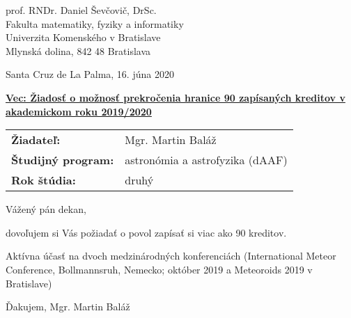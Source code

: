 \documentclass[12pt, a4paper, oneside]{report}
\begin{document}
    \linespread{1.3}
    \setcounter{secnumdepth}{0}
    \setlength{\parindent}{0cm}
    \setlength{\parskip}{3mm}
    \setlength{\baselineskip}{6mm}
    \setlength{\abovedisplayskip}{0mm}
    \setlength{\belowdisplayskip}{0mm}
    \setlength{\abovedisplayshortskip}{0mm}
    \setlength{\belowdisplayshortskip}{5mm}
    \renewcommand{\arraystretch}{1.2}

    \pagestyle{empty}
    \thispagestyle{first}

    \vspace*{6mm}
    \hfill
    \begin{minipage}{0.4 \linewidth}
        \linespread{1.6}
        prof. RNDr. Daniel Ševčovič, DrSc. \\[1mm]
        Fakulta matematiky, fyziky a informatiky \\[1mm]
        Univerzita Komenského v Bratislave \\[1mm]
        Mlynská dolina, 842 48 Bratislava

        \vspace*{12mm}
        Santa Cruz de La Palma, 16. júna 2020
    \end{minipage}

    \vspace{10mm}

    \underline{\textbf{Vec: Žiadosť o možnosť prekročenia hranice 90 zapísaných kreditov v akademickom roku 2019/2020}}

    \vspace{6mm}

    \begin{tabular}{l l}
        \textbf{Žiadateľ:}          & Mgr. Martin Baláž \\
        \textbf{Študijný program:}  & astronómia a astrofyzika (dAAF) \\
        \textbf{Rok štúdia:}        & druhý \\
    \end{tabular}

    \vspace{8mm}

    Vážený pán dekan,

    dovoľujem si Vás požiadať o povol zapísať si viac ako 90 kreditov.

    Aktívna účasť na dvoch medzinárodných konferenciách (International Meteor Conference, Bollmannsruh, Nemecko; október 2019
    a Meteoroids 2019 v Bratislave)


    \vspace*{6mm}

    Ďakujem,
    \hfill Mgr. Martin Baláž
\end{document}
